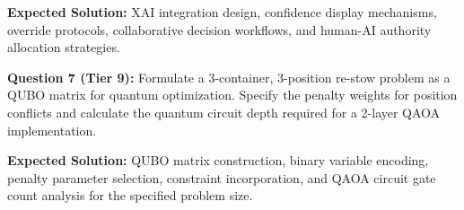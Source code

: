 \documentclass{article}
\begin{document}
\textbf{Expected Solution:} XAI integration design, confidence display mechanisms, override protocols, collaborative decision workflows, and human-AI authority allocation strategies.

\textbf{Question 7 (Tier 9):} Formulate a 3-container, 3-position re-stow problem as a QUBO matrix for quantum optimization. Specify the penalty weights for position conflicts and calculate the quantum circuit depth required for a 2-layer QAOA implementation.

\textbf{Expected Solution:} QUBO matrix construction, binary variable encoding, penalty parameter selection, constraint incorporation, and QAOA circuit gate count analysis for the specified problem size.
\end{document}
